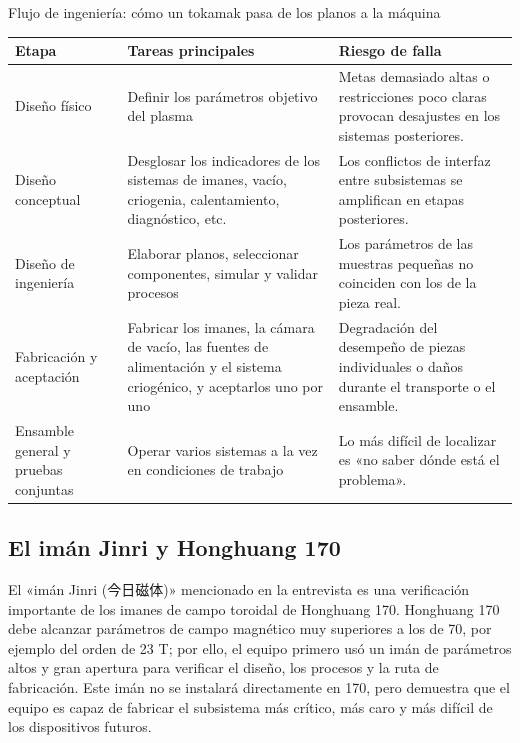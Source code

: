 \begin{knowledgebox}{Flujo de ingeniería: cómo un tokamak pasa de los planos a la máquina}
\begin{tabularx}{\textwidth}{p{}p{}X}
\toprule
Etapa & Tareas principales & Riesgo de falla \\
\midrule
Diseño físico & Definir los parámetros objetivo del plasma & Metas demasiado altas o restricciones poco claras provocan desajustes en los sistemas posteriores. \\
Diseño conceptual & Desglosar los indicadores de los sistemas de imanes, vacío, criogenia, calentamiento, diagnóstico, etc. & Los conflictos de interfaz entre subsistemas se amplifican en etapas posteriores. \\
Diseño de ingeniería & Elaborar planos, seleccionar componentes, simular y validar procesos & Los parámetros de las muestras pequeñas no coinciden con los de la pieza real. \\
Fabricación y aceptación & Fabricar los imanes, la cámara de vacío, las fuentes de alimentación y el sistema criogénico, y aceptarlos uno por uno & Degradación del desempeño de piezas individuales o daños durante el transporte o el ensamble. \\
Ensamble general y pruebas conjuntas & Operar varios sistemas a la vez en condiciones de trabajo & Lo más difícil de localizar es «no saber dónde está el problema». \\
\bottomrule
\end{tabularx}
\end{knowledgebox}

\subsection{El imán Jinri y Honghuang 170}

El «imán Jinri (今日磁体)» mencionado en la entrevista es una verificación importante de los imanes de campo toroidal de Honghuang 170. Honghuang 170 debe alcanzar parámetros de campo magnético muy superiores a los de 70, por ejemplo del orden de 23 T; por ello, el equipo primero usó un imán de parámetros altos y gran apertura para verificar el diseño, los procesos y la ruta de fabricación. Este imán no se instalará directamente en 170, pero demuestra que el equipo es capaz de fabricar el subsistema más crítico, más caro y más difícil de los dispositivos futuros.

